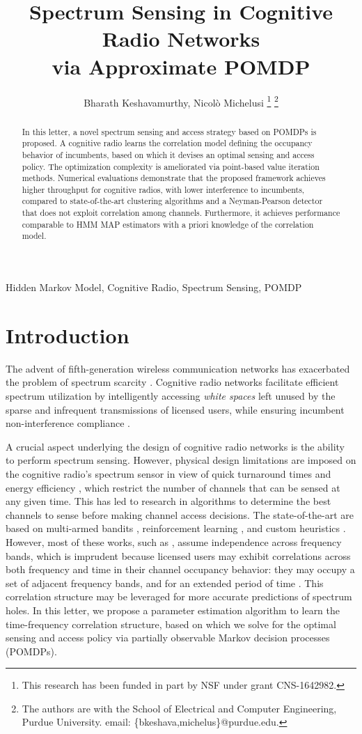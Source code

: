 \documentclass[10pt,twocolumn]{IEEEtran}
\title{Spectrum Sensing in Cognitive Radio Networks
\\
via Approximate POMDP}
\author{Bharath Keshavamurthy, Nicol\`{o} Michelusi
\thanks{This research has been funded in part by NSF under grant CNS-1642982.}
\thanks{The authors are with the School of Electrical and Computer Engineering, Purdue University. email: \{bkeshava,michelus\}@purdue.edu.}
\vspace{-12mm}}
\begin{document}
\maketitle
\thispagestyle{empty}
\pagestyle{empty} 
\begin{abstract}
In this letter, a novel spectrum sensing and access strategy based on POMDPs is proposed. A cognitive radio learns the correlation model defining the occupancy behavior of incumbents, based on which it devises an optimal sensing and access policy. The optimization complexity is ameliorated via point-based value iteration methods. Numerical evaluations demonstrate that the proposed framework achieves higher throughput for cognitive radios, with lower interference to incumbents, compared to state-of-the-art clustering algorithms and a Neyman-Pearson detector that does not exploit correlation among channels. Furthermore, it achieves performance comparable to HMM MAP estimators with a priori knowledge of the correlation model.
\end{abstract}
\vspace{-4mm}
\begin{IEEEkeywords}
Hidden Markov Model, Cognitive Radio, Spectrum Sensing, POMDP
\end{IEEEkeywords}
\vspace{-4mm}
\section{Introduction}\label{I}
The advent of fifth-generation wireless communication networks has exacerbated the problem of spectrum scarcity \cite{7158089}. Cognitive radio networks facilitate efficient spectrum utilization by intelligently accessing \emph{white spaces} left unused by the sparse and infrequent transmissions of licensed users, while ensuring incumbent non-interference compliance \cite{4562537}. 

A crucial aspect underlying the design of cognitive radio networks is the ability to perform spectrum sensing. However, physical design limitations are imposed on the cognitive radio's spectrum sensor in view of quick turnaround times and energy efficiency \cite{5990482}, which restrict the number of channels that can be sensed at any given time. This has led to research in algorithms to determine the best channels to sense before making channel access decisions. The state-of-the-art are based on multi-armed bandits \cite{7094730}, reinforcement learning \cite{6507570}, and custom heuristics \cite{4554696, 6956794}. However, most of these works, such as \cite{7094730, 6507570, 7895211, 7336513, 8571293, 5167826}, assume independence across frequency bands, which is imprudent because licensed users may exhibit correlations across both frequency and time in their channel occupancy behavior: they may occupy a set of adjacent frequency bands, and for an extended period of time \cite{6188346}. This correlation structure may be leveraged for more accurate predictions of spectrum holes. In this letter, we propose a parameter estimation algorithm to learn the time-frequency correlation structure, based on which we solve for the optimal sensing and access policy via partially observable Markov decision processes (POMDPs).
\end{document}

